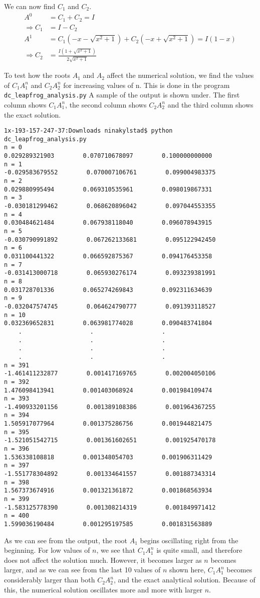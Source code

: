 \documentclass[12pt]{article} %
\begin{document}
We can now find $C_1$ and $C_2$.
\begin{align*}
A^0 &= C_1 + C_2 = I\\
\Rightarrow C_1 &= I - C_2\\
A^1 &= C_1(-x - \sqrt{x^2 +1}) + C_2(-x + \sqrt{x^2 +1}) = I(1 - x)\\
\Rightarrow C_2 &= \frac{I(1 + \sqrt{x^2 +1})}{2\sqrt{x^2 +1}}
\end{align*}

To test how the roots $A_1$ and $A_2$ affect the numerical solution, we find the values of $C_1A_1^n$ and $C_2A_2^n$ for increasing values of n. This is done in the program \texttt{dc\_leapfrog\_analysis.py} A sample of the output is shown under. The first column shows $C_1A_1^n$, the second column shows $C_2A_2^n$ and the third column shows the exact solution.

\begin{verbatim}
1x-193-157-247-37:Downloads ninakylstad$ python dc_leapfrog_analysis.py
n = 0
0.029289321903        0.070710678097        0.100000000000
n = 1
-0.029583679552        0.070007106761        0.099004983375
n = 2
0.029880995494        0.069310535961        0.098019867331
n = 3
-0.030181299462        0.068620896042        0.097044553355
n = 4
0.030484621484        0.067938118040        0.096078943915
n = 5
-0.030790991892        0.067262133681        0.095122942450
n = 6
0.031100441322        0.066592875367        0.094176453358
n = 7
-0.031413000718        0.065930276174        0.093239381991
n = 8
0.031728701336        0.065274269843        0.092311634639
n = 9
-0.032047574745        0.064624790777        0.091393118527
n = 10
0.032369652831        0.063981774028        0.090483741804
	.					.					.
	.					.					.
	.					.					.
	.					.					.
n = 391
-1.461411232877        0.001417169765        0.002004050106
n = 392
1.476098413941        0.001403068924        0.001984109474
n = 393
-1.490933201156        0.001389108386        0.001964367255
n = 394
1.505917077964        0.001375286756        0.001944821475
n = 395
-1.521051542715        0.001361602651        0.001925470178
n = 396
1.536338108818        0.001348054703        0.001906311429
n = 397
-1.551778304892        0.001334641557        0.001887343314
n = 398
1.567373674916        0.001321361872        0.001868563934
n = 399
-1.583125778390        0.001308214319        0.001849971412
n = 400
1.599036190484        0.001295197585        0.001831563889
\end{verbatim}

As we can see from the output, the root $A_1$ begins oscillating right from the beginning. For low values of $n$, we see that $C_1A_1^n$ is quite small, and therefore does not affect the solution much. However, it becomes larger as $n$ becomes larger, and as we can see from the last 10 values of $n$ shown here, $C_1A_1^n$ becomes considerably larger than both $C_2A_2^n$, and the exact analytical solution. Because of this, the numerical solution oscillates more and more with larger $n$. 
\end{document}
